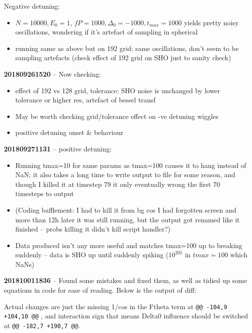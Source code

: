 \documentclass[a4paper,nobalancelastpage]{revtex4-1}
\newcommand{\mmtitle}[1]{\textcolor{multimode}{\textbf{#1}}}
\begin{document}
Negative detuning:

\begin{itemize}
\item  $N=10000, E_0=1$, $fP=1000, \Delta_0=-1000, t_{max}=1000$ yields pretty noisy oscillations, wondering if it's artefact of sampling in spherical
\item running same as above but on 192 grid: same oscillations, don't seem to be sampling artefacts (check effect of 192 grid on SHO just to sanity check)
\end{itemize}

\mmtitle{201809261520} -- Now checking:
\begin{itemize}
\item effect of 192 vs 128 grid, tolerance: SHO noise is unchanged by lower tolerance or higher res, artefact of bessel transf
\item May be worth checking grid/tolerance effect on -ve detuning wiggles
\item positive detuning onset \& behaviour
\end{itemize}

\mmtitle{201809271131} -- positive detuning:
\begin{itemize}
\item Running tmax=10 for same params as tmax=100 causes it to hang instead of NaN; it also takes a long time to write output to file for some reason, and though I killed it at timestep 79 it only eventually wrong the first 70 timesteps to output
\item (Coding bafflement: I had to kill it from bg cos I had forgotten screen and more than 12h later it was still running, but the output got renamed like it finished -- probs killing it didn't kill script handler?)
\item Data produced isn't any more useful and matches tmax=100 up to breaking suddenly -- data is SHO up until suddenly spiking ($10^{205}$ in $tmax=100$ which NaNs) 
\end{itemize}


\mmtitle{201810011836} -- Found some mistakes and fixed them, as well as tidied up some equations in code for ease of reading. Below is the output of diff:



Actual changes are just the missing 1/cos in the Ftheta term at  \texttt{@@ -104,9 +104,10 @@} , and interaction sign that means Delta0 influence should be switched at \texttt{@@ -182,7 +190,7 @@}. \\
\end{document}
